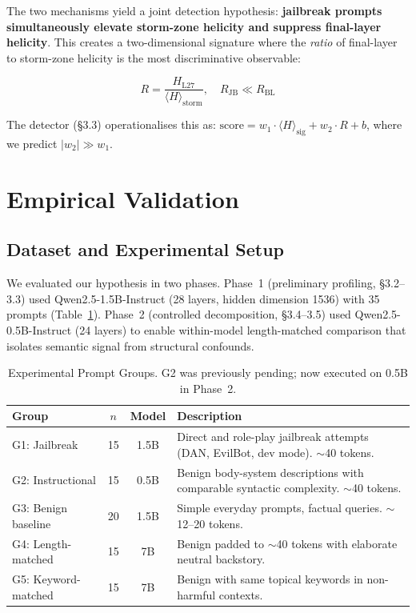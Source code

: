 \documentclass[12pt,a4paper]{article}
\begin{document}
The two mechanisms yield a joint detection hypothesis: \textbf{jailbreak prompts simultaneously elevate storm-zone helicity and suppress final-layer helicity}. This creates a two-dimensional signature where the \textit{ratio} of final-layer to storm-zone helicity is the most discriminative observable:

\begin{equation}
    R = \frac{H_{\text{L27}}}{\langle H \rangle_{\text{storm}}}, \quad R_{\text{JB}} \ll R_{\text{BL}}
    \label{eq:ratio}
\end{equation}

The detector (§3.3) operationalises this as: $\text{score} = w_1 \cdot \langle H \rangle_{\text{sig}} + w_2 \cdot R + b$, where we predict $|w_2| \gg w_1$.

\section{Empirical Validation}

\subsection{Dataset and Experimental Setup}

We evaluated our hypothesis in two phases. Phase~1 (preliminary profiling, §3.2--3.3) used Qwen2.5-1.5B-Instruct (28 layers, hidden dimension 1536) with 35 prompts (Table~\ref{tab:dataset}). Phase~2 (controlled decomposition, §3.4--3.5) used Qwen2.5-0.5B-Instruct (24 layers) to enable within-model length-matched comparison that isolates semantic signal from structural confounds.

\begin{table}[H]
\centering
\caption{Experimental Prompt Groups. G2 was previously pending; now executed on 0.5B in Phase~2.}
\label{tab:dataset}
\renewcommand{\arraystretch}{1.2}
\begin{tabular}{lccp{5cm}}
\toprule
Group & $n$ & Model & Description \\
\midrule
G1: Jailbreak       & 15 & 1.5B & Direct and role-play jailbreak attempts (DAN, EvilBot, dev mode). $\sim$40 tokens. \\
G2: Instructional   & 15 & 0.5B & Benign body-system descriptions with comparable syntactic complexity. $\sim$40 tokens. \\
G3: Benign baseline & 20 & 1.5B & Simple everyday prompts, factual queries. $\sim$12--20 tokens. \\
G4: Length-matched  & 15 & 7B   & Benign padded to $\sim$40 tokens with elaborate neutral backstory. \\
G5: Keyword-matched & 15 & 7B   & Benign with same topical keywords in non-harmful contexts. \\
\bottomrule
\end{tabular}
\end{table}
\end{document}

